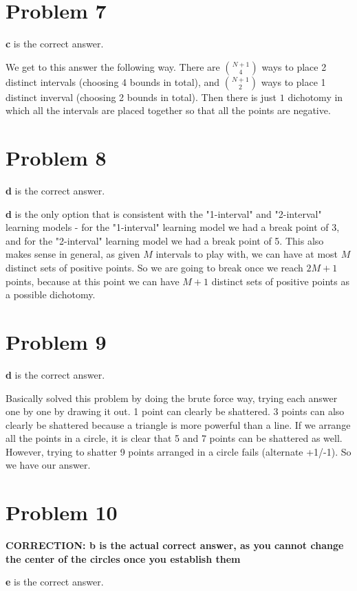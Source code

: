 \documentclass{article}
\begin{document}
\section*{Problem 7}
\textbf{c} is the correct answer.

\noindent We get to this answer the following way. There are $\binom{N+1}{4}$
ways to place 2 distinct intervals (choosing 4 bounds in total),
and $\binom{N+1}{2}$ ways to place 1 distinct inverval (choosing 2 bounds in
total). Then there is just $1$ dichotomy in which all the intervals are placed
together so that all the points are negative.
\section*{Problem 8}
\textbf{d} is the correct answer.

\noindent \textbf{d} is the only option that is consistent with the "1-interval"
and "2-interval" learning models - for the "1-interval" learning model we had
a break point of 3, and for the "2-interval" learning model we had a break point
of 5. This also makes sense in general, as given $M$ intervals to play with,
we can have at most $M$ distinct sets of positive points. So we are going to break
once we reach $2M + 1$ points, because at this point we can have $M+1$ distinct
sets of positive points as a possible dichotomy.
\section*{Problem 9}
\textbf{d} is the correct answer.

\noindent Basically solved this problem by doing the brute force way, trying
each answer one by one by drawing it out.
1 point can clearly be shattered. 3 points can also
clearly be shattered because a triangle is more powerful than a line. If we
arrange all the points in a circle, it is clear that 5 and 7 points can be
shattered as well. However, trying to shatter 9 points arranged in a circle
fails (alternate +1/-1). So we have our answer.
\section*{Problem 10}
\textbf{CORRECTION: b is the actual correct answer, as you cannot change the
    center of the circles once you establish them}

\noindent \textbf{e} is the correct answer.
\end{document}
